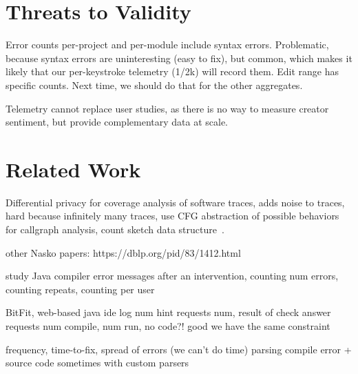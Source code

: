 \documentclass[english,submission,cleveref]{programming}
\begin{document}
\section{Threats to Validity}
\label{s:threats}

Error counts per-project and per-module include syntax errors.
Problematic, because syntax errors are uninteresting (easy to fix),
but common, which makes it likely that our per-keystroke telemetry (1/2k) will record them.
Edit range has specific counts.
Next time, we should do that for the other aggregates.

Telemetry cannot replace user studies, as there is no way to measure
creator sentiment, but provide complementary data at scale.


\section{Related Work}
\label{s:related}

Differential privacy for coverage analysis of software traces,
adds noise to traces,
hard because infinitely many traces,
use CFG abstraction of possible behaviors for callgraph analysis,
count sketch data structure~\cite{hlzbr-ecoop-2021}.

other Nasko papers:
https://dblp.org/pid/83/1412.html


\cite{bgimgm-cse-2016}
study Java compiler error messages after an intervention, counting num errors,
counting repeats, counting per user

\cite{anna-russo-kennedy-ms-2006}
BitFit, web-based java ide log num hint requests num, result of check answer
requests num compile, num run, no code?! good we have the same constraint

\cite{ab-sigcse-2015}
frequency, time-to-fix, spread of errors
 (we can't do time)
parsing compile error + source code
 sometimes with custom parsers
\end{document}
